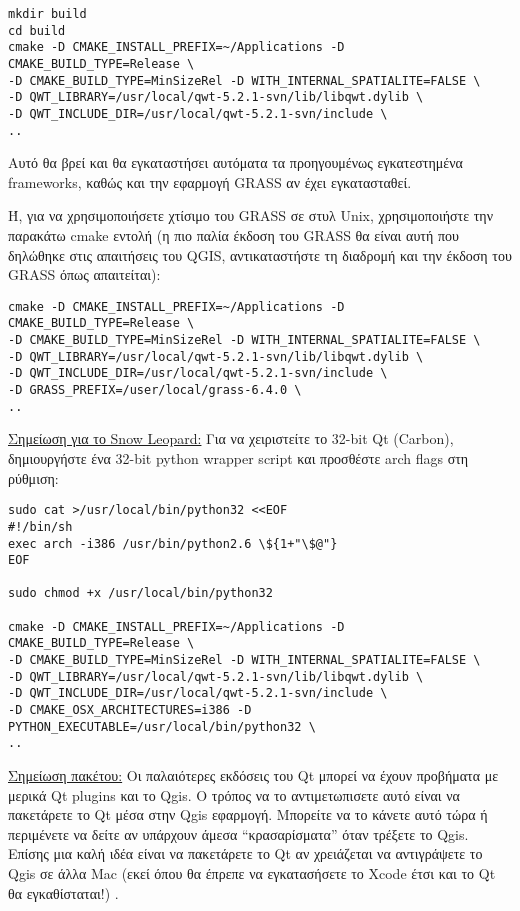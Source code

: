 \begin{verbatim}
mkdir build
cd build
cmake -D CMAKE_INSTALL_PREFIX=~/Applications -D CMAKE_BUILD_TYPE=Release \
-D CMAKE_BUILD_TYPE=MinSizeRel -D WITH_INTERNAL_SPATIALITE=FALSE \
-D QWT_LIBRARY=/usr/local/qwt-5.2.1-svn/lib/libqwt.dylib \
-D QWT_INCLUDE_DIR=/usr/local/qwt-5.2.1-svn/include \
..
\end{verbatim}

Αυτό θα βρεί και θα εγκαταστήσει αυτόματα τα προηγουμένως εγκατεστημένα frameworks, καθώς και την εφαρμογή GRASS αν έχει εγκατασταθεί.

Ή, για να χρησιμοποιήσετε χτίσιμο του GRASS σε στυλ Unix, χρησιμοποιήστε την παρακάτω cmake εντολή (η πιο παλία έκδοση του GRASS θα είναι αυτή που δηλώθηκε στις απαιτήσεις του QGIS, αντικαταστήστε τη διαδρομή και την έκδοση του GRASS όπως απαιτείται):

\begin{verbatim}
cmake -D CMAKE_INSTALL_PREFIX=~/Applications -D CMAKE_BUILD_TYPE=Release \
-D CMAKE_BUILD_TYPE=MinSizeRel -D WITH_INTERNAL_SPATIALITE=FALSE \
-D QWT_LIBRARY=/usr/local/qwt-5.2.1-svn/lib/libqwt.dylib \
-D QWT_INCLUDE_DIR=/usr/local/qwt-5.2.1-svn/include \
-D GRASS_PREFIX=/user/local/grass-6.4.0 \
..
\end{verbatim}

\underline{Σημείωση για το Snow Leopard:} Για να χειριστείτε το 32-bit Qt (Carbon), δημιουργήστε ένα 32-bit python wrapper script και προσθέστε arch flags στη ρύθμιση:

\begin{verbatim}
sudo cat >/usr/local/bin/python32 <<EOF
#!/bin/sh
exec arch -i386 /usr/bin/python2.6 \${1+"\$@"}
EOF

sudo chmod +x /usr/local/bin/python32

cmake -D CMAKE_INSTALL_PREFIX=~/Applications -D CMAKE_BUILD_TYPE=Release \
-D CMAKE_BUILD_TYPE=MinSizeRel -D WITH_INTERNAL_SPATIALITE=FALSE \
-D QWT_LIBRARY=/usr/local/qwt-5.2.1-svn/lib/libqwt.dylib \
-D QWT_INCLUDE_DIR=/usr/local/qwt-5.2.1-svn/include \
-D CMAKE_OSX_ARCHITECTURES=i386 -D PYTHON_EXECUTABLE=/usr/local/bin/python32 \
..
\end{verbatim}

\underline{Σημείωση πακέτου:} Οι παλαιότερες εκδόσεις του Qt μπορεί να έχουν προβήματα με μερικά Qt plugins και το Qgis.  O τρόπος να το αντιμετωπισετε αυτό είναι να πακετάρετε το Qt μέσα στην Qgis εφαρμογή. Μπορείτε να το κάνετε αυτό τώρα ή περιμένετε να δείτε αν υπάρχουν άμεσα “κρασαρίσματα”  όταν τρέξετε το Qgis. Επίσης μια καλή ιδέα είναι να πακετάρετε το Qt αν χρειάζεται να αντιγράψετε το Qgis σε άλλα Mac (εκεί όπου θα έπρεπε να εγκατασήσετε το Xcode έτσι και το Qt θα εγκαθίσταται!) .

